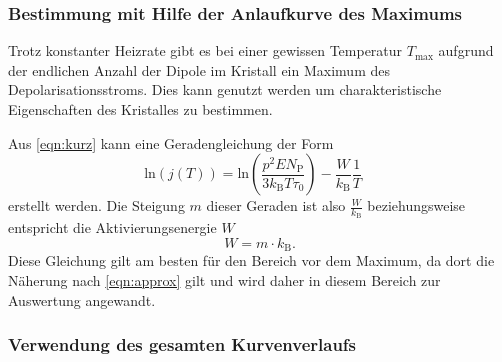 \subsubsection{Bestimmung mit Hilfe der Anlaufkurve des Maximums}

        Trotz konstanter Heizrate gibt es bei einer gewissen Temperatur $T_\text{max}$ aufgrund der endlichen Anzahl der Dipole im Kristall ein Maximum des Depolarisationsstroms.
        Dies kann genutzt werden um charakteristische Eigenschaften des Kristalles zu bestimmen.        
       	
        Aus \autoref{eqn:kurz} kann eine Geradengleichung der Form
        \begin{equation}
            \text{ln}(j(T)) = \text{ln}\left(\frac{p^2EN_\text{P}}{3k_\text{B}T\tau_0}\right) - \frac{W}{k_\text{B}} \frac{1}{T} \quad 
        \end{equation}
        erstellt werden.
        Die Steigung $m$ dieser Geraden ist also $\frac{W}{k_\text{B}}$ beziehungsweise entspricht die Aktivierungsenergie $W$
        \begin{equation}
            W = m \cdot k_\text{B}.
            \label{eqn:W}
        \end{equation}
        Diese Gleichung gilt am besten für den Bereich vor dem Maximum, da dort die Näherung nach \autoref{eqn:approx} gilt und wird daher in diesem Bereich zur Auswertung angewandt.			

\subsubsection{Verwendung des gesamten Kurvenverlaufs}

